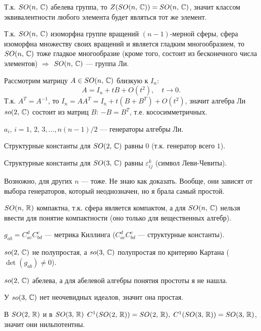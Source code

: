 \documentclass[a4paper,12pt]{article}
\begin{document}
	Т.к. $SO(n,\,\mathbb{C})$ абелева группа, то $ Z( SO(n,\,\mathbb{C}))= SO(n,\,\mathbb{C}) $,
	значит классом эквивалентности любого элемента будет являться тот же
	элемент.

	Т.к. $SO(n,\,\mathbb{C})$ изоморфна группе вращений $(n-1)$-мерной сферы,
	сфера изоморфна множеству своих вращений и является гладким
	многообразием, то $SO(n,\,\mathbb{C})$ тоже гладкое многообразие (кроме того,
	состоит из бесконечного числа элементов) $ \Rightarrow $  $SO(n,\,\mathbb{C})$
	--- группа Ли.

	Рассмотрим матрицу $ A\in SO(n,\,\mathbb{C}) $ близкую к $I_n$:
	\begin{equation}
		 A=I_n+tB+O(t^{2}),\quad t \to  0 
	.\end{equation}
	Т.к. $ A^{T}=A^{-1} $, то $ I_n=AA^{T}=I_n+t(B+B^{T})+
	O(t^{2})$, значит алгебра Ли $so(2,\,\mathbb{C})$ состоит из матриц $B$:
	$ -B=B^{T} $, т.е. кососимметричных.

	$ a_{i},\, i=1,\,2,\,3,\ldots, n(n-1) /2 $ --- генераторы алгебры Ли.

	Структурные константы для $SO(2,\,\mathbb{C})$ равны $0$ (т.к. генератор всего
	$1$).

	Структурные константы для $SO(3,\,\mathbb{C})$ равны $ \varepsilon_{ij}^{k} $
	(символ Леви-Чевиты).

	Возножно, для других $n$ --- тоже. Не знаю как доказать. Вообще, они
	зависят от выбора генераторов, который неоднозначен, но я брала самый
	простой.
	
	$SO(n,\,\mathbb{R})$ компактна, т.к. сфера является компактом, а для
	$SO(n,\,\mathbb{C})$ нельзя ввести для понятие компактности (оно только для
	вещественных алгебр).
	
	$ g_{ab}=C^{d}_{ac}C^{c}_{bd} $ --- метрика Киллинга
	($ C^{d}_{ac}C^{c}_{bd} $ --- структурные константы).

	$so(2,\,\mathbb{C})$ не полупростая, а $so(3,\,\mathbb{C})$ полупростая по критерию
	Картана ($ \det(g_{ab})\neq0 $).

	$so(2,\,\mathbb{C})$ абелева, а для абелевой алгебры понятия простоты я не
	нашла.

	У $so(3,\,\mathbb{C})$ нет неочевидных идеалов, значит она простая.

	В $SO(2,\,\mathbb{R})$ и в $SO(3,\,\mathbb{R})$ $ C^1(SO(2,\,\mathbb{R}))=SO(2,\,\mathbb{R}),\;
	C^1(SO(3,\,\mathbb{R}))=SO(3,\,\mathbb{R})$, значит они нильпотентны.
\end{document}
